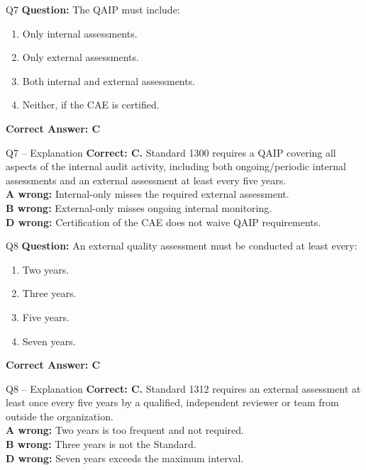 \documentclass[aspectratio=169,10pt]{beamer}
\begin{document}
	\begin{frame}[t]{Q7}
		\small
		\textbf{Question:} The QAIP must include:
		\begin{enumerate}[label=\Alph*.,itemsep=1pt,topsep=2pt]
			\item Only internal assessments.
			\item Only external assessments.
			\item Both internal and external assessments.
			\item Neither, if the CAE is certified.
		\end{enumerate}
		\vspace{4pt}
		\textbf{Correct Answer: C}
	\end{frame}
	
	\begin{frame}[t]{Q7 -- Explanation}
		\small
		\textbf{Correct: C.} Standard 1300 requires a QAIP covering all aspects of the internal audit activity, including both ongoing/periodic internal assessments and an external assessment at least every five years. \\[4pt]
		\textbf{A wrong:} Internal-only misses the required external assessment. \\[2pt]
		\textbf{B wrong:} External-only misses ongoing internal monitoring. \\[2pt]
		\textbf{D wrong:} Certification of the CAE does not waive QAIP requirements.
	\end{frame}
	
	\begin{frame}[t]{Q8}
		\small
		\textbf{Question:} An external quality assessment must be conducted at least every:
		\begin{enumerate}[label=\Alph*.,itemsep=1pt,topsep=2pt]
			\item Two years.
			\item Three years.
			\item Five years.
			\item Seven years.
		\end{enumerate}
		\vspace{4pt}
		\textbf{Correct Answer: C}
	\end{frame}
	
	\begin{frame}[t]{Q8 -- Explanation}
		\small
		\textbf{Correct: C.} Standard 1312 requires an external assessment at least once every five years by a qualified, independent reviewer or team from outside the organization. \\[4pt]
		\textbf{A wrong:} Two years is too frequent and not required. \\[2pt]
		\textbf{B wrong:} Three years is not the Standard. \\[2pt]
		\textbf{D wrong:} Seven years exceeds the maximum interval.
	\end{frame}
	
\end{document}
